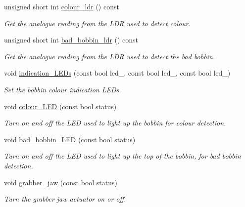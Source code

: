 \begin{DoxyCompactItemize}
unsigned short int \hyperlink{classIDP_1_1HardwareAbstractionLayer_ae4f163981d213ff3dea4b21e8aa92063}{colour\_\-ldr} () const 
\begin{DoxyCompactList}\small\item\em Get the analogue reading from the LDR used to detect colour. \item\end{DoxyCompactList}\item 
unsigned short int \hyperlink{classIDP_1_1HardwareAbstractionLayer_af4a8cb5072cf89263b97a3e8e1727da8}{bad\_\-bobbin\_\-ldr} () const 
\begin{DoxyCompactList}\small\item\em Get the analogue reading from the LDR used to detect the bad bobbin. \item\end{DoxyCompactList}\item 
void \hyperlink{classIDP_1_1HardwareAbstractionLayer_a0ffde4a54900074b646efd285d9d6807}{indication\_\-LEDs} (const bool led\_, const bool led\_, const bool led\_)
\begin{DoxyCompactList}\small\item\em Set the bobbin colour indication LEDs. \item\end{DoxyCompactList}\item 
void \hyperlink{classIDP_1_1HardwareAbstractionLayer_a6574abe8852976bfa94c00e13d8c1686}{colour\_\-LED} (const bool status)
\begin{DoxyCompactList}\small\item\em Turn on and off the LED used to light up the bobbin for colour detection. \item\end{DoxyCompactList}\item 
void \hyperlink{classIDP_1_1HardwareAbstractionLayer_ad2feaf269fbcda10fb1192b575a4963a}{bad\_\-bobbin\_\-LED} (const bool status)
\begin{DoxyCompactList}\small\item\em Turn on and off the LED used to light up the top of the bobbin, for bad bobbin detection. \item\end{DoxyCompactList}\item 
void \hyperlink{classIDP_1_1HardwareAbstractionLayer_a44d5a4c942332ba9ffe027de3dba83f0}{grabber\_\-jaw} (const bool status)
\begin{DoxyCompactList}\small\item\em Turn the grabber jaw actuator on or off. \item\end{DoxyCompactList}\item 

\end{DoxyCompactItemize}
